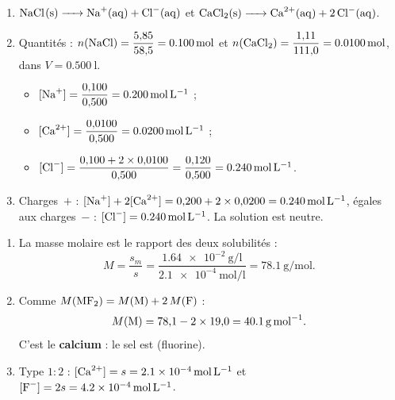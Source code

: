\documentclass[11pt,a4paper]{article}
\begin{document}
\begin{corrige}
\begin{enumerate}[label=\alph*)]
  \item $\ce{NaCl(s) -> Na^{+}(aq) + Cl^{-}(aq)}$ \quad et \quad
        $\ce{CaCl2(s) -> Ca^{2+}(aq) + 2 Cl^{-}(aq)}$.
  \item Quantités : $n(\ce{NaCl})=\dfrac{5{,}85}{58{,}5}=\qty{0.100}{\mole}$ et
        $n(\ce{CaCl2})=\dfrac{1{,}11}{111{,}0}=\qty{0.0100}{\mole}$, dans $V=\qty{0.500}{\litre}$.
        \begin{itemize}[leftmargin=1.6em,topsep=1pt,itemsep=1pt]
          \item $[\ce{Na+}] = \dfrac{0{,}100}{0{,}500} = \qty{0.200}{\mole\per\litre}$ ;
          \item $[\ce{Ca^{2+}}] = \dfrac{0{,}0100}{0{,}500} = \qty{0.0200}{\mole\per\litre}$ ;
          \item $[\ce{Cl-}] = \dfrac{0{,}100 + 2\times 0{,}0100}{0{,}500}
                 = \dfrac{0{,}120}{0{,}500} = \qty{0.240}{\mole\per\litre}$.
        \end{itemize}
  \item Charges~$+$ : $[\ce{Na+}] + 2[\ce{Ca^{2+}}] = 0{,}200 + 2\times 0{,}0200 = \qty{0.240}{\mole\per\litre}$,
        égales aux charges~$-$ : $[\ce{Cl-}]=\qty{0.240}{\mole\per\litre}$. La solution est neutre.
\end{enumerate}
\end{corrige}

\begin{corrige}
\begin{enumerate}[label=\alph*)]
  \item La masse molaire est le rapport des deux solubilités :
        \[ M = \dfrac{s_m}{s} = \dfrac{\qty{1.64e-2}{\gram\per\litre}}{\qty{2.1e-4}{\mole\per\litre}}
             = \qty{78.1}{\gram\per\mole}. \]
  \item Comme $M(\ce{MF2}) = M(\ce{M}) + 2\,M(\ce{F})$ :
        \[ M(\ce{M}) = 78{,}1 - 2\times 19{,}0 = \qty{40.1}{\gram\per\mole}. \]
        C'est le \textbf{calcium} : le sel est  (fluorine).
  \item Type $1{:}2$ : $[\ce{Ca^{2+}}]=s=\qty{2.1e-4}{\mole\per\litre}$ et
        $[\ce{F-}]=2s=\qty{4.2e-4}{\mole\per\litre}$.
\end{enumerate}
\end{corrige}
\end{document}
